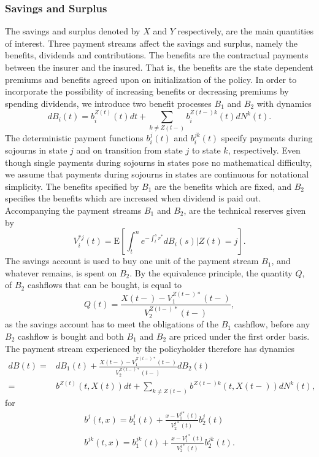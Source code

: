 \documentclass[12pt]{article}
\newcommand{\E}{\text{E}}
\theoremstyle{my_thm}
\begin{document}
\subsubsection{Savings and Surplus}
The savings and surplus denoted by $X$ and $Y$ respectively, are the main quantities of interest. Three payment streams affect the savings and surplus, namely the benefits, dividends and contributions. The benefits are the contractual payments between the insurer and the insured. That is, the benefits are the state dependent premiums and benefits agreed upon on initialization of the policy. In order to incorporate the possibility of increasing benefits or decreasing premiums by spending dividends, we introduce two benefit processes $B_1$ and $B_2$ with dynamics
$$
dB_i(t)=b_i^{Z(t)}(t) dt +\sum_{k \neq Z(t-)} b_i^{Z(t-)k}(t)dN^k(t).
$$
The deterministic payment functions $b_i^j(t)$ and $b_i^{jk}(t)$ specify payments during sojourns in state $j$ and on transition from state $j$ to state $k$, respectively. Even though single payments during sojourns in states pose no mathematical difficulty, we assume that payments during sojourns in states are continuous for notational simplicity. The benefits specified by $B_1$ are the benefits which are fixed, and $B_2$ specifies the benefits which are increased when dividend is paid out. Accompanying the payment streams $B_1$ and $B_2$, are the technical reserves given by
$$
V_i^{*j}(t)=\E \left[ \int_t^n e^{-\int_t^s r^*} dB_i(s) \big| Z(t)=j \right].
$$
The savings account is used to buy one unit of the payment stream $B_1$, and whatever remains, is spent on $B_2$. By the equivalence principle, the quantity $Q$, of $B_2$ cashflows that can be bought, is equal to
$$
Q(t)=\frac{X(t-)-V_1^{Z(t-)*}(t-)}{V_2^{Z(t-)*}(t-)},
$$
as the savings account has to meet the obligations of the $B_1$ cashflow, before any $B_2$ cashflow is bought and both $B_1$ and $B_2$ are priced under the first order basis. The payment stream experienced by the policyholder therefore has dynamics
\begin{align*}
dB(t)=&dB_1(t)+\frac{X(t-)-V_1^{Z(t-)*}(t-)}{V_2^{Z(t-)*}(t-)}dB_2(t)
\\
=&b^{Z(t)}(t,X(t)) dt +\sum_{k \neq Z(t-)} b^{Z(t-)k}(t,X(t-))dN^k(t),
\end{align*}
for
\begin{gather*}
b^j(t,x)=b_1^j(t)+\frac{x-V_1^{j*}(t)}{V_2^{j*}(t)}b_2^j(t)
\\
b^{jk}(t,x)=b_1^{jk}(t)+\frac{x-V_1^{j*}(t)}{V_2^{j*}(t)}b_2^{jk}(t).
\end{gather*}
\end{document}
